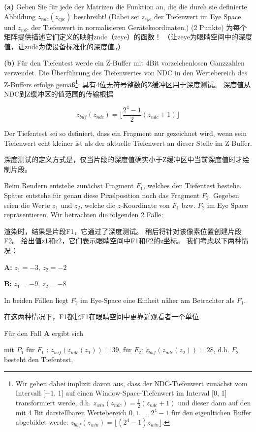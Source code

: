 \documentclass[fleqn]{article}
\begin{document}
\indent\textbf{(a)} Geben Sie für jede der Matrizen die Funktion an,
 die die durch sie definierte Abbildung $z_{ndc}(z_{eye})$ beschreibt! 
 (Dabei sei $z_{eye}$ der Tiefenwert im Eye Space und $z_{ndc}$ der Tiefenwert in 
 normalisieren Gerätekoordinaten.) (2 Punkte)
 为每个矩阵提供描述它们定义的映射zndc（zeye）的函数！ （让zeye为眼睛空间中的深度值，让zndc为使设备标准化的深度值。）

\indent\textbf{(b)} Für den Tiefentest werde ein Z-Buffer mit 4Bit vorzeichenlosen Ganzzahlen verwendet. Die Überführung des Tiefenwertes von NDC in den Wertebereich des Z-Buffers erfolge gemäß\footnote{Wir gehen dabei implizit davon aus, dass der NDC-Tiefenwert zunächst vom Intervall [−1, 1] auf einen Window-Space-Tiefenwert im Interval [0, 1] transformiert werde, d.h. $z_{win}(z_{ndc}) = \frac{1}{2}(z_{ndc} +1)$ und dieser dann auf den mit 4 Bit darstellbaren Wertebereich $0, 1, . . . , 2^4 − 1$ für den eigenltichen Buffer abgebildet werde: $z_{buf}(z_{win}) = \lfloor(2^4 − 1)z_{win}\rfloor.$}:
具有4位无符号整数的Z缓冲区用于深度测试。 深度值从NDC到Z缓冲区的值范围的传输根据

$$z_{buf}(z_{ndc})=\lfloor\frac{2^4-1}{2}(z_{ndc}+1)\rfloor$$

Der Tiefentest sei so definiert, dass ein Fragment nur gezeichnet wird, wenn sein Tiefenwert echt kleiner ist als der aktuelle Tiefenwert an dieser Stelle im Z-Buffer.

深度测试的定义方式是，仅当片段的深度值确实小于Z缓冲区中当前深度值时才绘制片段。

Beim Rendern entstehe zunächst Fragment $F_1$,
 welches den Tiefentest bestehe.
 Später entstehe für genau diese Pixelposition noch das Fragment $F_2$. 
 Gegeben seien die Werte $z_1$ und $z_2$, welche die $z$-Koordinate von $F_1$ bzw. $F_2$ 
 im Eye Space repräsentieren. Wir betrachten die folgenden 2 Fälle:

 渲染时，结果是片段F1，它通过了深度测试。 稍后将针对该像素位置创建片段F2。 给出值z1和z2，它们表示眼睛空间中F1和F2的z坐标。 我们考虑以下两种情况：

\textbf{A:} $z_1=-3,\,z_2=-2$

\textbf{B:} $z_1=-9,\,z_2=-8$

In beiden Fällen liegt $F_2$ im Eye-Space eine Einheit näher am Betrachter als $F_1$.

在这两种情况下，F1都比F1在眼睛空间中更靠近观看者一个单位.

Für den Fall \textbf{A} ergibt sich

mit $P_1$ für $F_1$ : $z_{buf}(z_{ndc}(z_1))=39$, für $F_2$: $z_{buf}(z_{ndc}(z_2))=28$, d.h. $F_2$ besteht den Tiefentest,
\end{document}
